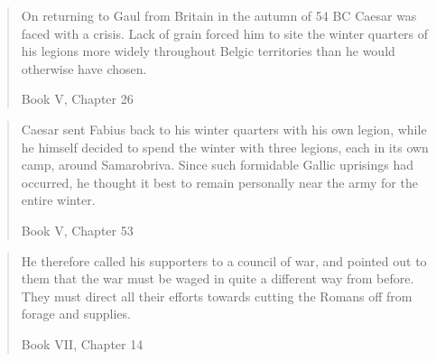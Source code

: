 \blockquote[Book V, Chapter 26]{On returning to Gaul from Britain in the autumn of 54 BC Caesar was faced with a crisis. Lack of grain forced him to site the winter quarters of his legions more widely throughout Belgic territories than he would otherwise have chosen.}

\blockquote[Book V, Chapter 53]{Caesar sent Fabius back to his winter quarters with his own legion, while he himself decided to spend the winter with three legions, each in its own camp, around Samarobriva. Since such formidable Gallic uprisings had occurred, he thought it best to remain personally near the army for the entire winter.}

\blockquote[Book VII, Chapter 14]{He therefore called his supporters to a council of war, and pointed out to them that the war must be waged in quite a different way from before. They must direct all their efforts towards cutting the Romans off from forage and supplies.}